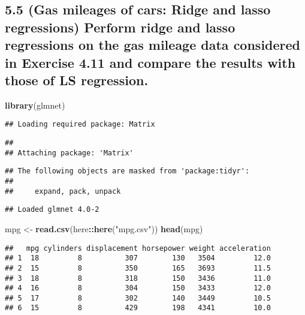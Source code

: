 \documentclass[
]{article}
\newenvironment{Shaded}{\begin{snugshade}}{\end{snugshade}}
\newcommand{\KeywordTok}[1]{\textcolor[rgb]{0.13,0.29,0.53}{\textbf{#1}}}
\newcommand{\NormalTok}[1]{#1}
\newcommand{\OperatorTok}[1]{\textcolor[rgb]{0.81,0.36,0.00}{\textbf{#1}}}
\newcommand{\StringTok}[1]{\textcolor[rgb]{0.31,0.60,0.02}{#1}}
\begin{document}
\hypertarget{gas-mileages-of-cars-ridge-and-lasso-regressions-perform-ridge-and-lasso-regressions-on-the-gas-mileage-data-considered-in-exercise-4.11-and-compare-the-results-with-those-of-ls-regression.}{%
\subsection{5.5 (Gas mileages of cars: Ridge and lasso regressions)
Perform ridge and lasso regressions on the gas mileage data considered
in Exercise 4.11 and compare the results with those of LS
regression.}\label{gas-mileages-of-cars-ridge-and-lasso-regressions-perform-ridge-and-lasso-regressions-on-the-gas-mileage-data-considered-in-exercise-4.11-and-compare-the-results-with-those-of-ls-regression.}}

\begin{Shaded}
\begin{Highlighting}[]
\KeywordTok{library}\NormalTok{(glmnet)}
\end{Highlighting}
\end{Shaded}

\begin{verbatim}
## Loading required package: Matrix
\end{verbatim}

\begin{verbatim}
## 
## Attaching package: 'Matrix'
\end{verbatim}

\begin{verbatim}
## The following objects are masked from 'package:tidyr':
## 
##     expand, pack, unpack
\end{verbatim}

\begin{verbatim}
## Loaded glmnet 4.0-2
\end{verbatim}

\begin{Shaded}
\begin{Highlighting}[]
\NormalTok{mpg <-}\StringTok{ }\KeywordTok{read.csv}\NormalTok{(here}\OperatorTok{::}\KeywordTok{here}\NormalTok{(}\StringTok{"mpg.csv"}\NormalTok{))}
\KeywordTok{head}\NormalTok{(mpg)}
\end{Highlighting}
\end{Shaded}

\begin{verbatim}
##   mpg cylinders displacement horsepower weight acceleration
## 1  18         8          307        130   3504         12.0
## 2  15         8          350        165   3693         11.5
## 3  18         8          318        150   3436         11.0
## 4  16         8          304        150   3433         12.0
## 5  17         8          302        140   3449         10.5
## 6  15         8          429        198   4341         10.0
\end{verbatim}
\end{document}

